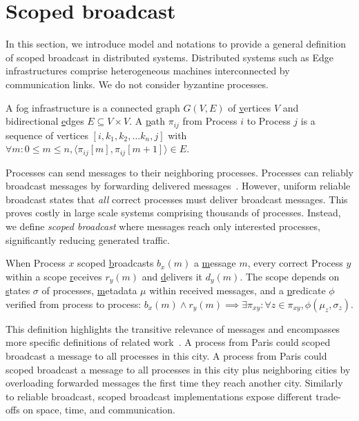 
\section{Scoped broadcast}
\label{sec:scoped}

In this section, we introduce model and notations to provide a general
definition of scoped broadcast in distributed systems.  Distributed
systems such as Edge infrastructures comprise heterogeneous machines
interconnected by communication links. We do not consider byzantine
processes.

\begin{definition}
  A fog infrastructure is a connected \underline{g}raph $G(V, E)$ of
  \underline{v}ertices $V$ and bidirectional \underline{e}dges $E
  \subseteq V \times V$.  A \underline{p}ath $\pi_{ij}$ from Process
  $i$ to Process $j$ is a sequence of vertices $[i, k_1, k_2, \ldots
    k_n, j]$ with $\forall m: 0\leq m \leq n, \langle \pi_{ij}[m],
  \pi_{ij}[m+1] \rangle \in E$.
\end{definition}

Processes can send messages to their neighboring processes. Processes
can reliably broadcast messages by forwarding delivered
messages~\cite{hadzilacos1994modular,nedelec2018causal,raynal2013distributed}. However,
uniform reliable broadcast states that \emph{all} correct processes
must deliver broadcast messages. This proves costly in large scale
systems comprising thousands of processes. Instead, we define
\emph{scoped broadcast} where messages reach only interested
processes, significantly reducing generated traffic.

\begin{definition}
  When Process $x$ scoped \underline{b}roadcasts $b_x(m)$ a
  \underline{m}essage $m$, every correct Process $y$ within a scope
  \underline{r}eceives $r_y(m)$ and \underline{d}elivers it
  $d_y(m)$. The scope depends on \underline{s}tates $\sigma$ of
  processes, \underline{m}etadata $\mu$ within received messages, and
  a \underline{p}redicate $\phi$ verified from process to process:
  $b_x(m) \wedge r_y(m) \implies \exists \pi_{xy} : \forall z \in
  \pi_{xy}, \phi(\mu_z, \sigma_z)$.
\end{definition}

This definition highlights the transitive relevance of messages and
encompasses more specific definitions of related
work~\cite{hsiao2005scoped,lue2006scoped,wang2015prodiluvian}.  A
process from Paris could scoped broadcast a message to all processes
in this city. A process from Paris could scoped broadcast a message to
all processes in this city plus neighboring cities by overloading
forwarded messages the first time they reach another city. Similarly
to reliable broadcast, scoped broadcast implementations expose
different trade-offs on space, time, and communication.

